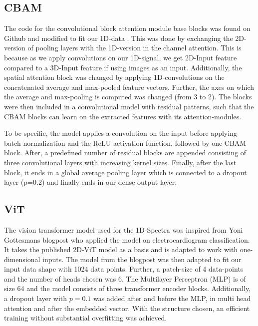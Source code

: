 \subsection{CBAM}
The code for the convolutional block attention module base blocks was found on Github and modified to fit our 1D-data \cite{mazzia__2023}. This was done by exchanging the 2D-version of pooling layers with the 1D-version in the channel attention. This is because as we apply convolutions on our 1D-signal, we get 2D-Input feature compared to a 3D-Input feature if using images as an input. Additionally, the spatial attention block was changed by applying 1D-convolutions on the concatenated average and max-pooled feature vectors. Further, the axes on which the average and max-pooling is computed was changed (from 3 to 2).
The blocks were then included in a convolutional model with residual patterns, such that the CBAM blocks can learn on the extracted features with its attention-modules. 

To be specific, the model applies a convolution on the input before applying batch normalization and the ReLU activation function, followed by one CBAM block. After, a predefined number of residual blocks are appended consisting of three convolutional layers with increasing kernel sizes.
Finally, after the last block, it ends in a global average pooling layer which is connected to a dropout layer (p=0.2) and finally ends in our dense output layer.

\subsection{ViT}
The vision transformer model used for the 1D-Spectra was inspired from Yoni Gottesmans blogpost \cite{noauthor_interpretable_2023} who applied the model on electrocardiogram classification. 
It takes the published 2D-ViT model \cite{dosovitskiy_image_2021}as a basis and is adapted to work with one-dimensional inputs.
The model from the blogpost was then adapted to fit our input data shape with 1024 data points. Further, a patch-size of 4 data-points and the number of heads chosen was 6.
The Multilayer Perceptron (MLP) is of size 64 and the model consists of three transformer encoder blocks. Additionally, a dropout layer with $p=0.1$ was added after and before the MLP, in multi head attention and after the embedded vector.
With the structure chosen, an efficient training without substantial overfitting was achieved. 

